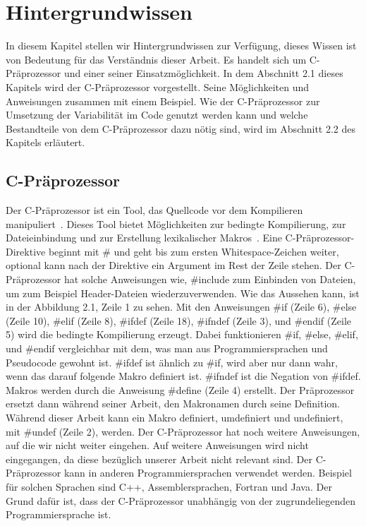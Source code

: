 \chapter{Hintergrundwissen}
In diesem Kapitel stellen wir Hintergrundwissen zur Verfügung, dieses Wissen ist von Bedeutung für das Verständnis dieser Arbeit. Es handelt sich um C-Präprozessor und einer seiner Einsatzmöglichkeit. In dem Abschnitt 2.1 dieses Kapitels wird der C-Präprozessor vorgestellt. Seine Möglichkeiten und Anweisungen zusammen mit einem Beispiel. Wie der C-Präprozessor zur Umsetzung der Variabilität im Code genutzt werden kann und welche Bestandteile von dem C-Präprozessor dazu nötig sind, wird im Abschnitt 2.2 des Kapitels erläutert. \\






\section{C-Präprozessor}
Der C-Präprozessor ist ein Tool, das Quellcode vor dem Kompilieren manipuliert~\cite{ABKS13}. Dieses Tool bietet Möglichkeiten zur bedingte Kompilierung, zur  Dateieinbindung und zur Erstellung lexikalischer Makros~\cite{ABKS13}. Eine C-Präprozessor-Direktive beginnt mit \# und geht bis zum ersten Whitespace-Zeichen weiter, optional kann nach der Direktive ein Argument im Rest der Zeile stehen. Der C-Präprozessor hat solche Anweisungen wie, \#include zum Einbinden von Dateien, um zum Beispiel Header-Dateien wiederzuverwenden. Wie das Aussehen kann, ist in der Abbildung 2.1, Zeile 1 zu sehen. Mit den Anweisungen \#if (Zeile 6), \#else (Zeile 10), \#elif (Zeile 8), \#ifdef (Zeile 18), \#ifndef (Zeile 3), und \#endif (Zeile 5) wird die bedingte Kompilierung erzeugt. Dabei funktionieren \#if, \#else, \#elif, und \#endif vergleichbar mit dem, was man aus Programmiersprachen und Pseudocode gewohnt ist. \#ifdef ist ähnlich zu \#if, wird aber nur dann wahr, wenn das darauf folgende Makro definiert ist. \#ifndef ist die Negation von \#ifdef. Makros werden durch die Anweisung \#define (Zeile 4) erstellt. Der Präprozessor ersetzt dann während seiner Arbeit, den Makronamen durch seine Definition. Während dieser Arbeit kann ein Makro definiert, umdefiniert und undefiniert, mit \#undef (Zeile 2), werden. Der C-Präprozessor hat noch weitere Anweisungen, auf die wir nicht weiter eingehen. Auf weitere Anweisungen wird nicht eingegangen, da diese bezüglich unserer Arbeit nicht relevant sind. Der C-Präprozessor kann in anderen Programmiersprachen verwendet werden. Beispiel für solchen Sprachen sind C++, Assemblersprachen, Fortran und Java. Der Grund dafür ist, dass der C-Präprozessor unabhängig von der zugrundeliegenden Programmiersprache ist. \\

